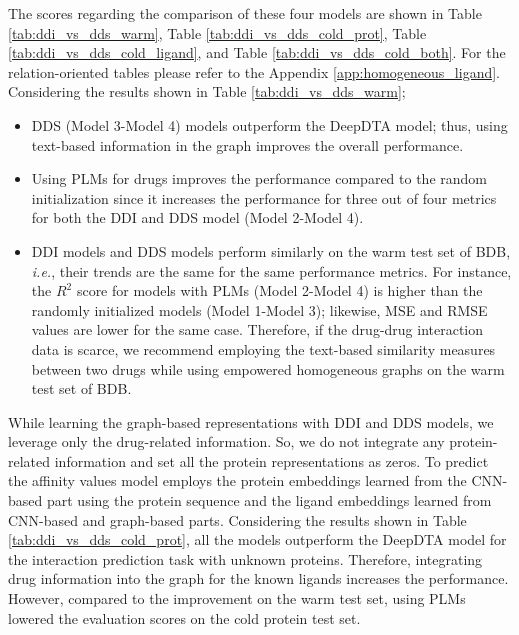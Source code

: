 \newpage
The scores regarding the comparison of these four models are shown in Table \ref{tab:ddi_vs_dds_warm}, Table \ref{tab:ddi_vs_dds_cold_prot}, Table \ref{tab:ddi_vs_dds_cold_ligand}, and Table \ref{tab:ddi_vs_dds_cold_both}. For the relation-oriented tables please refer to the Appendix \ref{app:homogeneous_ligand}. Considering the results shown in Table \ref{tab:ddi_vs_dds_warm}; 
\begin{itemize} %
    \item DDS (Model 3-Model 4) models outperform the DeepDTA model; thus, using text-based information in the graph improves the overall performance. 
    \item Using PLMs for drugs improves the performance compared to the random initialization since it increases the performance for three out of four metrics for both the DDI and DDS model (Model 2-Model 4).
    \item DDI models and DDS models perform similarly on the warm test set of BDB, \textit{i.e.}, their trends are the same for the same performance metrics. For instance, the $R^2$ score for models with PLMs (Model 2-Model 4) is higher than the randomly initialized models (Model 1-Model 3); likewise, MSE and RMSE values are lower for the same case. Therefore, if the drug-drug interaction data is scarce, we recommend employing the text-based similarity measures between two drugs while using empowered homogeneous graphs on the warm test set of BDB.
\end{itemize}



\newpage
While learning the graph-based representations with DDI and DDS models, we leverage only the drug-related information. So, we do not integrate any protein-related information and set all the protein representations as zeros. To predict the affinity values model employs the protein embeddings learned from the CNN-based part using the protein sequence and the ligand embeddings learned from CNN-based and graph-based parts. Considering the results shown in Table \ref{tab:ddi_vs_dds_cold_prot}, all the models outperform the DeepDTA model for the interaction prediction task with unknown proteins. Therefore, integrating drug information into the graph for the known ligands increases the performance. However, compared to the improvement on the warm test set, using PLMs lowered the evaluation scores on the cold protein test set.

